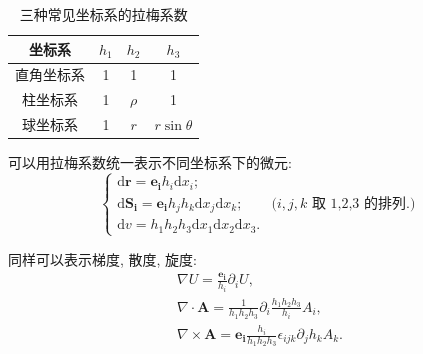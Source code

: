 \begin{table}[H]
    \centering
    \caption{三种常见坐标系的拉梅系数}
    \begin{tabular}{cccc} \toprule
        \textbf{坐标系} & $h_1$ & $h_2$  & $h_3$         \\\midrule
        直角坐标系        & 1     & 1      & 1             \\
        柱坐标系         & 1     & $\rho$ & 1             \\
        球坐标系         & 1     & $r$    & $r\sin\theta$ \\\bottomrule
    \end{tabular}
\end{table}

可以用拉梅系数统一表示不同坐标系下的微元:
\begin{equation}
    \begin{cases}
        \mathrm{d}\bm{r}=\bm{e_i}h_i\mathrm{d}x_i;                                                   \\
        \mathrm{d}\bm{S_i}=\bm{e_i}h_jh_k\mathrm{d}x_j\mathrm{d}x_k; & \text{($i,j,k$ 取 1,2,3 的排列.)} \\
        \mathrm{d}v=h_1h_2h_3\mathrm{d}x_1\mathrm{d}x_2\mathrm{d}x_3.
    \end{cases}
\end{equation}

同样可以表示梯度, 散度, 旋度:
\begin{gather}
    \nabla U=\frac{\bm{e_i}}{h_i}\partial_iU, \\
    \nabla\cdot\bm{A}=\frac{1}{h_1h_2h_3}\partial_i\frac{h_1h_2h_3}{h_i}A_i, \\
    \nabla\times\bm{A}=\bm{e_i}\frac{h_i}{h_1h_2h_3}\epsilon_{ijk}\partial_jh_kA_k.
\end{gather}
